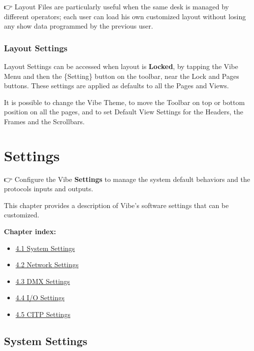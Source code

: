 \documentclass[
]{article}
\providecommand{\tightlist}{%
  \setlength{\itemsep}{0pt}\setlength{\parskip}{0pt}}
\begin{document}
👉 Layout Files are particularly useful when the same desk is managed by different operators; each user can load his own customized layout without losing any show data programmed by the previous user.

\hypertarget{layout-settings}{%
\subsubsection{Layout Settings}\label{layout-settings}}

Layout Settings can be accessed when layout is \textbf{Locked}, by tapping the Vibe Menu and then the \{Setting\} button on the toolbar, near the Lock and Pages buttons. These settings are applied as defaults to all the Pages and Views.

It is possible to change the Vibe Theme, to move the Toolbar on top or bottom position on all the pages, and to set Default View Settings for the Headers, the Frames and the Scrollbars.

\hypertarget{settings}{%
\section{Settings}\label{settings}}

👉 Configure the Vibe \textbf{Settings} to manage the system default behaviors and the protocols inputs and outputs.

This chapter provides a description of Vibe's software settings that can be customized.

\textbf{Chapter index:}

\begin{itemize}
\tightlist
\item
  \protect\hyperlink{System-Settings-4.1}{4.1 System Settings}
\item
  \protect\hyperlink{Network-Settings-4.2}{4.2 Network Settings}
\item
  \protect\hyperlink{DMX-Settings-4.3}{4.3 DMX Settings}
\item
  \protect\hyperlink{I-O-Settings-4.4}{4.4 I/O Settings}
\item
  \protect\hyperlink{CITP-Settings-4.5}{4.5 CITP Settings}
\end{itemize}

\hypertarget{System-Settings-4.1}{%
\subsection{System Settings}\label{System-Settings-4.1}}
\end{document}
